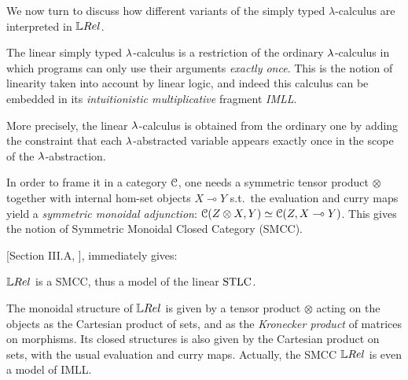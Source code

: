 We now turn to discuss how different variants of the simply typed $\lambda$-calculus are interpreted in $\LREL$.

The linear simply typed $\lambda$-calculus is a restriction of the ordinary $\lambda$-calculus in which programs can only use their arguments \emph{exactly once}.
This is the notion of linearity taken into account by linear logic, and indeed this calculus can be embedded in its \emph{intuitionistic multiplicative} fragment \emph{IMLL}.

More precisely, the linear $\lambda$-calculus is obtained from the ordinary one by adding the constraint that each $\lambda$-abstracted variable appears exactly once in the scope of the $\lambda$-abstraction.

In order to frame it in a category $\mathcal{C}$, one needs a symmetric tensor product $\otimes$ together with internal hom-set objects $X\multimap Y$ s.t.\ the evaluation and curry maps yield a \emph{symmetric monoidal adjunction}: $\mathcal{C}(Z\otimes X, Y) \simeq \mathcal{C} (Z, X\multimap Y)$.
This gives the notion of Symmetric Monoidal Closed Category (SMCC).

[Section III.A, \cite{Manzo2013}], immediately gives:

\begin{fact}\label{fact:LREL_SMCC}
 $\LREL$ is a SMCC, thus a model of the linear $\mathrm{STLC}$.
\end{fact}

The monoidal structure of $\LREL$ is given by a tensor product $\otimes$ acting on the objects as the Cartesian product of sets, and as the \emph{Kronecker product}
 of matrices on morphisms.
Its closed structures is also given by the Cartesian product on sets, with the usual evaluation and curry maps.
Actually, the SMCC $\LREL$ is even a model of IMLL.
